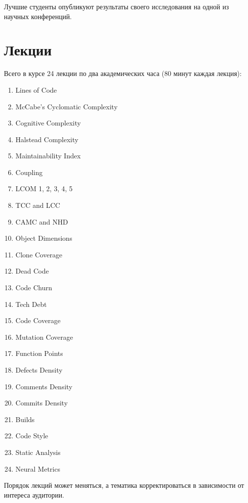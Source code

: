 \documentclass[nobrand,anonymous,nodate,nosecurity]{huawei}
\begin{document}
Лучшие студенты опубликуют результаты своего исследования на одной из научных конференций.

\section{Лекции}

Всего в курсе 24 лекции по два академических часа (80 минут каждая лекция):
\begin{enumerate}
    \setlength\itemsep{0em}
    \item Lines of Code
    \item McCabe's Cyclomatic Complexity
    \item Cognitive Complexity
    \item Halstead Complexity
    \item Maintainability Index

    \item Coupling
    \item LCOM 1, 2, 3, 4, 5
    \item TCC and LCC
    \item CAMC and NHD
    \item Object Dimensions

    \item Clone Coverage
    \item Dead Code
    \item Code Churn
    \item Tech Debt

    \item Code Coverage
    \item Mutation Coverage

    \item Function Points

    \item Defects Density
    \item Comments Density
    \item Commits Density

    \item Builds
    \item Code Style
    \item Static Analysis

    \item Neural Metrics
\end{enumerate}

Порядок лекций может меняться, а тематика корректироваться в зависимости от интереса аудитории.
\end{document}
